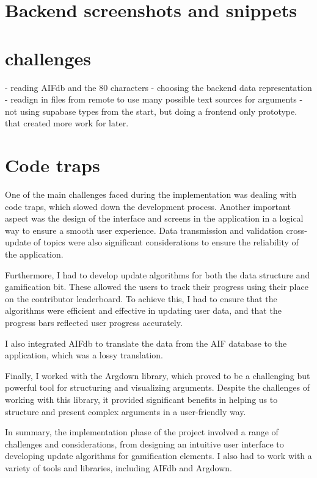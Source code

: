 \documentclass{report}
\begin{document}
\section{Backend screenshots and snippets}

\section{challenges}
- reading AIFdb and the 80 characters 
- choosing the backend data representation
- readign in files from remote to use many possible text sources for arguments
- not using supabase types from the start, but doing a frontend only prototype. that created more work for later.

\section{Code traps}
One of the main challenges faced during the implementation was dealing with code traps, which slowed down the development process. Another important aspect was the design of the interface and screens in the application in a logical way to ensure a smooth user experience. Data transmission and validation cross-update of topics were also significant considerations to ensure the reliability of the application.

Furthermore, I had to develop update algorithms for both the data structure and gamification bit. These allowed the users to track their progress using their place on the contributor leaderboard. To achieve this, I had to ensure that the algorithms were efficient and effective in updating user data, and that the progress bars reflected user progress accurately.

I also integrated AIFdb to translate the data from the AIF database to the application, which was a lossy translation.

Finally, I worked with the Argdown library, which proved to be a challenging but powerful tool for structuring and visualizing arguments. Despite the challenges of working with this library, it provided significant benefits in helping us to structure and present complex arguments in a user-friendly way.

In summary, the implementation phase of the project involved a range of challenges and considerations, from designing an intuitive user interface to developing update algorithms for gamification elements. I also had to work with a variety of tools and libraries, including AIFdb and Argdown. 
\end{document}
